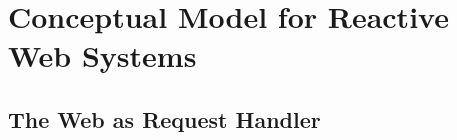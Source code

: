 
\chapter{Conceptual Model for Reactive Web Systems}
%

%





\section{The Web as Request Handler}


